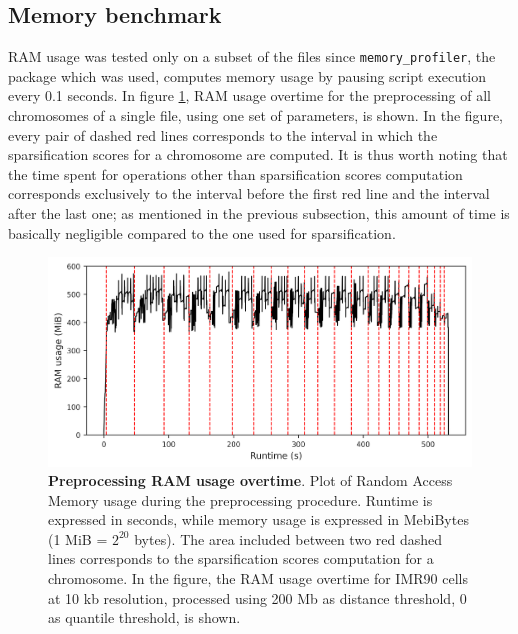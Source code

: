 
\subsection{Memory benchmark}

RAM usage was tested only on a subset of the files since \texttt{memory\_profiler}, the package which was used, computes memory usage by pausing script execution every 0.1 seconds. In figure \ref{fig:memorybenchmark}, RAM usage overtime for the preprocessing of all chromosomes of a single file, using one set of parameters, is shown. In the figure, every pair of dashed red lines corresponds to the interval in which the sparsification scores for a chromosome are computed. It is thus worth noting that the time spent for operations other than sparsification scores computation corresponds exclusively to the interval before the first red line and the interval after the last one; as mentioned in the previous subsection, this amount of time is basically negligible compared to the one used for sparsification.

\begin{figure}[h]
  \centering 
  \includegraphics[width=1\textwidth]{memory_benchmark.png}
  \caption{\textbf{Preprocessing RAM usage overtime}. Plot of Random Access Memory usage during the preprocessing procedure. Runtime is expressed in seconds, while memory usage is expressed in MebiBytes (1 MiB = $2^{20}$ bytes). The area included between two red dashed lines corresponds to the sparsification scores computation for a chromosome. In the figure, the RAM usage overtime for IMR90 cells at 10 kb resolution, processed using 200 Mb as distance threshold, 0 as quantile threshold, is shown.}
  \label{fig:memorybenchmark}
\end{figure}

